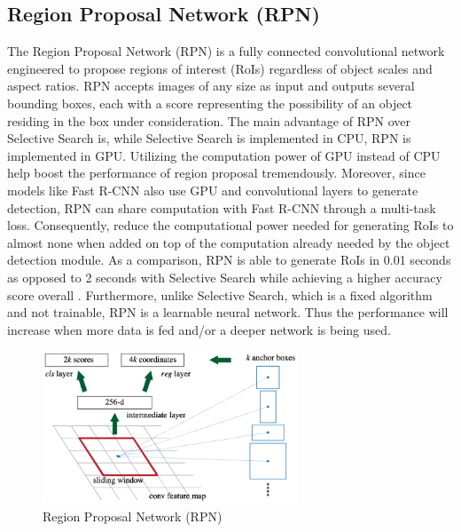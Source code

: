 \subsection{Region Proposal Network (RPN)}  \label{subsec:rpn}
The Region Proposal Network (RPN) is a fully connected convolutional network engineered to propose regions of interest (RoIs) regardless of object scales and aspect ratios. RPN accepts images of any size as input and outputs several bounding boxes, each with a score representing the possibility of an object residing in the box under consideration. The main advantage of RPN over Selective Search is, while Selective Search is implemented in CPU, RPN is implemented in GPU. Utilizing the computation power of GPU instead of CPU help boost the performance of region proposal tremendously. Moreover, since models like Fast R-CNN also use GPU and convolutional layers to generate detection, RPN can share computation with Fast R-CNN through a multi-task loss. Consequently, reduce the computational power needed for generating RoIs to almost none when added on top of the computation already needed by the object detection module. As a comparison, RPN is able to generate RoIs in 0.01 seconds as opposed to 2 seconds with Selective Search while achieving a higher accuracy score overall \cite{faster_rcnn_2015}. Furthermore, unlike Selective Search, which is a fixed algorithm and not trainable, RPN is a learnable neural network. Thus the performance will increase when more data is fed and/or a deeper network is being used. 

\begin{figure}[!ht]
    \centering
    \includegraphics[width=3in]{figures/rpn_anchor.png}
    \caption{Region Proposal Network (RPN) \cite{faster_rcnn_2015}} \label{fig:faster_rcnn_anchor}
\end{figure}

